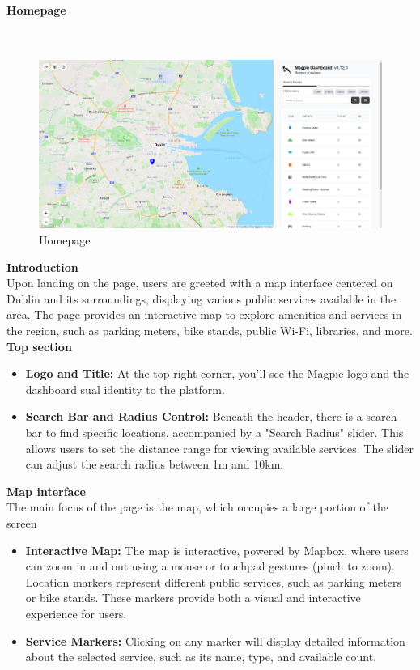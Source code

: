 \paragraph{Homepage}\mbox{}\\
\begin{figure}[h]
    \centering
    \includegraphics[width=1\textwidth]{images/site/home/homepage_1.png}
    \caption{Homepage}
\end{figure}
\newline
\textbf{Introduction}\\
Upon landing on the page, users are greeted with a map interface centered on Dublin and its surroundings, displaying various public services available in the area. The page provides an interactive map to explore amenities and services in the region, such as parking meters, bike stands, public Wi-Fi, libraries, and more.\\
\textbf{Top section}
\begin{itemize}
    \item \textbf{Logo and Title:} At the top-right corner, you’ll see the Magpie logo and the dashboard sual identity to the platform.
    \item \textbf{Search Bar and Radius Control:} Beneath the header, there is a search bar to find specific locations, accompanied by a "Search Radius" slider. This allows users to set the distance range for viewing available services. The slider can adjust the search radius between 1m and 10km.
\end{itemize}
\textbf{Map interface}\\
The main focus of the page is the map, which occupies a large portion of the screen
\begin{itemize}
    \item \textbf{Interactive Map:} The map is interactive, powered by Mapbox, where users can zoom in and out using a mouse or touchpad gestures (pinch to zoom). Location markers represent different public services, such as parking meters or bike stands. These markers provide both a visual and interactive experience for users.
    \item \textbf{Service Markers:} Clicking on any marker will display detailed information about the selected service, such as its name, type, and available count.
\end{itemize}
